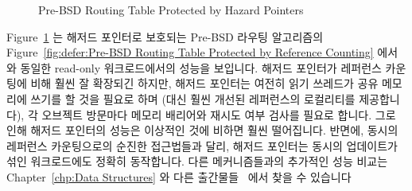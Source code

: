 \begin{figure}[tb]
\centering
{}
\caption{Pre-BSD Routing Table Protected by Hazard Pointers}
\label{fig:defer:Pre-BSD Routing Table Protected by Hazard Pointers}
\end{figure}

Figure~\ref{fig:defer:Pre-BSD Routing Table Protected by Hazard Pointers} 는
해저드 포인터로 보호되는 Pre-BSD 라우팅 알고리즘의
Figure~\ref{fig:defer:Pre-BSD Routing Table Protected by Reference Counting}
에서와 동일한 read-only 워크로드에서의 성능을 보입니다.
해저드 포인터가 레퍼런스 카운팅에 비해 훨씬 잘 확장되긴 하지만, 해저드 포인터는
여전히 읽기 쓰레드가 공유 메모리에 쓰기를 할 것을 필요로 하며 (대신 훨씬 개선된
레퍼런스의 로컬리티를 제공합니다), 각 오브젝트 방문마다 메모리 배리어와 재시도
여부 검사를 필요로 합니다.
그로 인해 해저드 포인터의 성능은 이상적인 것에 비하면 훨씬 떨어집니다.
반면에, 동시의 레퍼런스 카운팅으로의 순진한 접근법들과 달리, 해저드 포인터는
동시의 업데이트가 섞인 워크로드에도 정확히 동작합니다.
다른 메커니즘들과의 추가적인 성능 비교는
Chapter~\ref{chp:Data Structures} 와 다른
출간물들~\cite{ThomasEHart2007a,McKenney:2013:SDS:2483852.2483867,MagedMichael04a}
에서 찾을 수 있습니다
\iffalse

